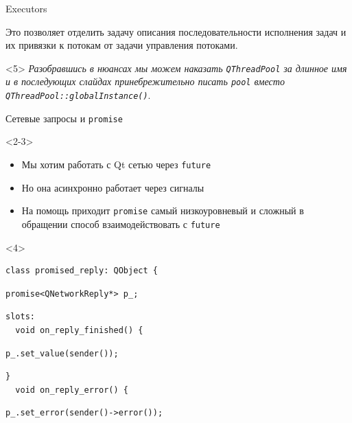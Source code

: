 \documentclass[aspectratio=169,hyperref={unicode},17pt]{beamer}
\begin{document}
\begin{frame}[fragile,t]{Executors}
\begin{onlyenv}
Это позволяет отделить задачу описания последовательности исполнения задач и их привязки к потокам от задачи управления
потоками.
\end{onlyenv}
\begin{onlyenv}<5>
\textit{\footnotesize{Разобравшись в нюансах мы можем наказать \texttt{QThreadPool} за длинное имя и в последующих слайдах принебрежительно писать \texttt{pool} вместо \texttt{QThreadPool::globalInstance()}}}.
\end{onlyenv}
\end{frame}

\begin{frame}[fragile,t]{Сетевые запросы и \texttt{promise}}
\begin{onlyenv}<2-3>
\begin{itemize}
 \item<2-> Мы хотим работать с Qt сетью через \texttt{future}
 \item<2-> Но она асинхронно работает через сигналы
 \item<3> На помощь приходит \texttt{promise} самый низкоуровневый и сложный в обращении способ взаимодействовать с \texttt{future}
\end{itemize}
\end{onlyenv}
\begin{onlyenv}<4>
\begin{lstlisting}[style=cppcode,aboveskip=0pt,belowskip=0pt]
class promised_reply: QObject {
\end{lstlisting}
\begin{lstlisting}[style=cppcode,backgroundcolor=\color{gray!30},aboveskip=0pt,belowskip=0pt]
  promise<QNetworkReply*> p_;
\end{lstlisting}
\begin{lstlisting}[style=cppcode,aboveskip=0pt,belowskip=0pt]
slots:
  void on_reply_finished() {
\end{lstlisting}
\begin{lstlisting}[style=cppcode,backgroundcolor=\color{gray!30},aboveskip=0pt,belowskip=0pt]
    p_.set_value(sender());
\end{lstlisting}
\begin{lstlisting}[style=cppcode,aboveskip=0pt,belowskip=0pt]
  }
  void on_reply_error() {
\end{lstlisting}
\begin{lstlisting}[style=cppcode,backgroundcolor=\color{gray!30},aboveskip=0pt,belowskip=0pt]
    p_.set_error(sender()->error());
\end{lstlisting}
\begin{lstlisting}[style=cppcode,aboveskip=0pt,belowskip=0pt]

\end{lstlisting}
\end{onlyenv}
\end{frame}
\end{document}
